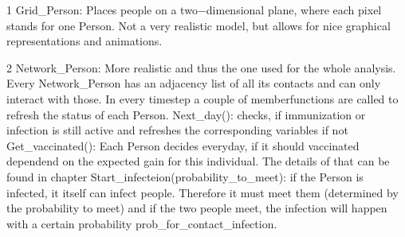 \documentclass[11pt]{article}
\begin{document}
1	Grid\_Person: Places people on a two$-$dimensional plane, where each pixel stands for one Person. Not a very realistic model, but allows for nice graphical representations and animations.

2	Network\_Person: More realistic and thus the one used for the whole analysis. Every Network\_Person has an adjacency list of all its contacts and can only interact with those.
In every timestep a couple of memberfunctions are called to refresh the status of each Person.
Next\_day(): checks, if immunization or infection is still active and refreshes the corresponding variables if not
Get\_vaccinated(): Each Person decides everyday, if it should vaccinated dependend on the expected gain for this individual. The details of that can be found in chapter
Start\_infecteion(probability\_to\_meet): if the Person is infected, it itself can infect people. Therefore it must meet them (determined by the probability to meet) and if the two people meet, the infection will happen with a certain probability prob\_for\_contact\_infection.
\end{document}
